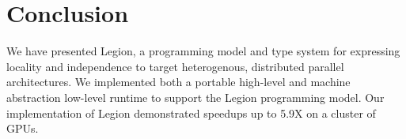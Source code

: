 
\section{Conclusion}
We have presented Legion, a programming model and
type system for expressing locality and independence
to target heterogenous, distributed parallel architectures.  
We implemented both a portable high-level and machine 
abstraction low-level runtime to support the Legion 
programming model.  Our implementation of Legion demonstrated
speedups up to 5.9X on a cluster of GPUs.
